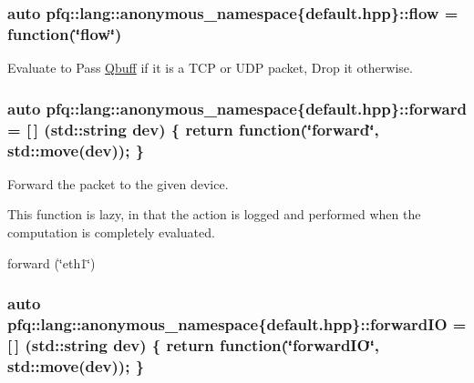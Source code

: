 \subsubsection[{\texorpdfstring{flow}{flow}}]{\setlength{\rightskip}{0pt plus 5cm}auto pfq\+::lang\+::anonymous\+\_\+namespace\{default.\+hpp\}\+::flow = {\bf function}(\char`\"{}flow\char`\"{})}\hypertarget{namespacepfq_1_1lang_1_1anonymous__namespace_02default_8hpp_03_af6c7518847c8c960b0e98cd856871a1b}{}\label{namespacepfq_1_1lang_1_1anonymous__namespace_02default_8hpp_03_af6c7518847c8c960b0e98cd856871a1b}


Evaluate to {\ttfamily Pass} \hyperlink{structpfq_1_1lang_1_1Qbuff}{Qbuff} if it is a T\+CP or U\+DP packet, {\ttfamily Drop} it otherwise. 

\subsubsection[{\texorpdfstring{forward}{forward}}]{\setlength{\rightskip}{0pt plus 5cm}auto pfq\+::lang\+::anonymous\+\_\+namespace\{default.\+hpp\}\+::forward = \mbox{[}$\,$\mbox{]} (std\+::string dev) \{ return {\bf function}(\char`\"{}forward\char`\"{}, std\+::move(dev)); \}}\hypertarget{namespacepfq_1_1lang_1_1anonymous__namespace_02default_8hpp_03_aae08247030fea0f5e398b0a03d382257}{}\label{namespacepfq_1_1lang_1_1anonymous__namespace_02default_8hpp_03_aae08247030fea0f5e398b0a03d382257}


Forward the packet to the given device. 

This function is lazy, in that the action is logged and performed when the computation is completely evaluated.

forward (\char`\"{}eth1\char`\"{}) 
\subsubsection[{\texorpdfstring{forward\+IO}{forwardIO}}]{\setlength{\rightskip}{0pt plus 5cm}auto pfq\+::lang\+::anonymous\+\_\+namespace\{default.\+hpp\}\+::forward\+IO = \mbox{[}$\,$\mbox{]} (std\+::string dev) \{ return {\bf function}(\char`\"{}forward\+IO\char`\"{}, std\+::move(dev)); \}}\hypertarget{namespacepfq_1_1lang_1_1anonymous__namespace_02default_8hpp_03_a3fb6ec42e38c3329534ea3a7024fd967}{}\label{namespacepfq_1_1lang_1_1anonymous__namespace_02default_8hpp_03_a3fb6ec42e38c3329534ea3a7024fd967}



